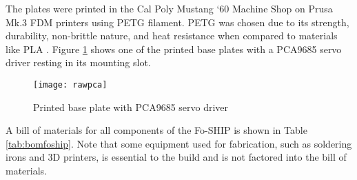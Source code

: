 \documentclass[11pt]{ucthesisCP}
\begin{document}
The plates were printed in the Cal Poly Mustang ‘60 Machine Shop on Prusa Mk.3 FDM printers using PETG filament. PETG was chosen due to its strength, durability, non-brittle nature, and heat resistance when compared to materials like PLA \cite{plapetg}. Figure \ref{fig:rawpca} shows one of the printed base plates with a PCA9685 servo driver resting in its mounting slot.

\begin{figure}[htbp]
	\centering
	\texttt{[image: rawpca]}
	\caption{Printed base plate with PCA9685 servo driver}
	\label{fig:rawpca}
\end{figure}

A bill of materials for all components of the Fo-SHIP is shown in Table \ref{tab:bomfoship}. Note that some equipment used for fabrication, such as soldering irons and 3D printers, is essential to the build and is not factored into the bill of materials.
\end{document}
